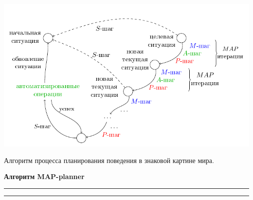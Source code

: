 \documentclass[preview,border=10pt]{standalone}
\begin{document}
	\begin{center}
		\includegraphics[width=\textwidth]{../images/algo/ru/beh_plan2_ru}
	\end{center}
	
	Алгоритм процесса планирования поведения в знаковой картине мира.
	
	\textbf{Алгоритм MAP-planner}
	\vspace*{2pt}
	\hrule
	\vspace*{1pt}
	\hrule
		
	\begin{algorithmic}[1]
		
	\end{algorithmic}
\end{document}
